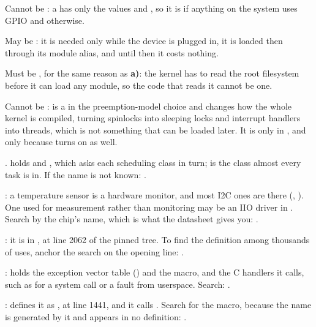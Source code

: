 Cannot be : a  has only the values  and , so it is
 if anything on the system uses GPIO and  otherwise.

 May be : it is needed only while the device is plugged in, it is loaded then
through its module alias, and until then it costs nothing.

 Must be , for the same reason as \textbf{a)}: the kernel has to read the root
filesystem before it can load any module, so the code that reads it cannot be one.

 Cannot be :  is a  in the preemption-model choice
and changes how the whole kernel is compiled, turning spinlocks into sleeping locks and interrupt
handlers into threads, which is not something that can be loaded later. It is  only in
, and only because  turns  on as well.


 .  holds  and
, which asks each scheduling class in turn;  is the class almost
every task is in. If the name is not known: .

 : a temperature sensor is a hardware monitor, and most I2C ones are
there (, ). One used for measurement rather than monitoring may be an
IIO driver in . Search by the chip's name, which is what the
datasheet gives you: .

 : it is in , at line 2062 of the pinned tree. To find the
definition among thousands of uses, anchor the search on the opening line: .

 :  holds the exception vector table
() and the  macro, and  the C handlers it
calls, such as  for a system call or a fault from userspace. Search:
.

 :  defines it as , at line 1441,
and it calls . Search for the macro, because the name  is
generated by it and appears in no definition: .

